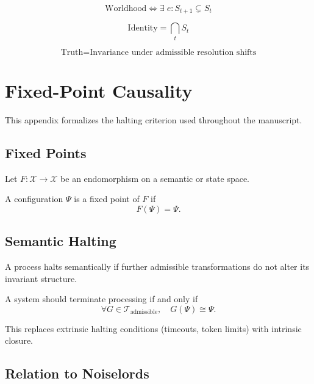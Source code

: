 \documentclass[11pt]{book}
\begin{document}
\[
\text{Worldhood} \iff \exists \; e : S_{t+1} \subsetneq S_t
\]

\[
\text{Identity} = \bigcap_t S_t
\]

\[
\text{Truth} = \text{Invariance under admissible resolution shifts}
\]


\chapter{Fixed-Point Causality}

This appendix formalizes the halting criterion used throughout the
manuscript.

\section{Fixed Points}

Let $F : \mathcal{X} \to \mathcal{X}$ be an endomorphism on a semantic or
state space.

\begin{definition}
A configuration $\Psi$ is a fixed point of $F$ if
\[
F(\Psi) = \Psi.
\]
\end{definition}

\section{Semantic Halting}

\begin{definition}
A process halts semantically if further admissible transformations do
not alter its invariant structure.
\end{definition}

\begin{proposition}
A system should terminate processing if and only if
\[
\forall G \in \mathcal{T}_{\text{admissible}}, \quad G(\Psi) \cong \Psi.
\]
\end{proposition}

This replaces extrinsic halting conditions (timeouts, token limits)
with intrinsic closure.

\section{Relation to Noiselords}
\end{document}
